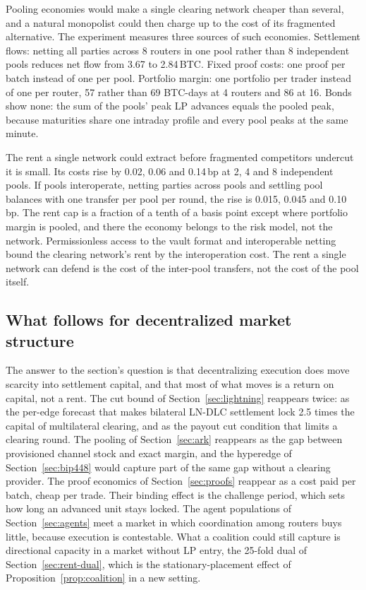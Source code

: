 Pooling economies would make a single clearing network cheaper than several, and a natural monopolist could then charge up to the cost of its fragmented alternative. The experiment measures three sources of such economies. Settlement flows: netting all parties across 8 routers in one pool rather than 8 independent pools reduces net flow from 3.67 to 2.84\,BTC. Fixed proof costs: one proof per batch instead of one per pool. Portfolio margin: one portfolio per trader instead of one per router, 57 rather than 69 BTC-days at 4 routers and 86 at 16. Bonds show none: the sum of the pools' peak LP advances equals the pooled peak, because maturities share one intraday profile and every pool peaks at the same minute.

The rent a single network could extract before fragmented competitors undercut it is small. Its costs rise by 0.02, 0.06 and 0.14\,bp at 2, 4 and 8 independent pools. If pools interoperate, netting parties across pools and settling pool balances with one transfer per pool per round, the rise is 0.015, 0.045 and 0.10\,bp. The rent cap is a fraction of a tenth of a basis point except where portfolio margin is pooled, and there the economy belongs to the risk model, not the network. Permissionless access to the vault format and interoperable netting bound the clearing network's rent by the interoperation cost. The rent a single network can defend is the cost of the inter-pool transfers, not the cost of the pool itself.

\subsection{What follows for decentralized market structure}
\label{sec:rent-implications}

The answer to the section's question is that decentralizing execution does move scarcity into settlement capital, and that most of what moves is a return on capital, not a rent. The cut bound of Section~\ref{sec:lightning} reappears twice: as the per-edge forecast that makes bilateral LN-DLC settlement lock 2.5 times the capital of multilateral clearing, and as the payout cut condition that limits a clearing round. The pooling of Section~\ref{sec:ark} reappears as the gap between provisioned channel stock and exact margin, and the hyperedge of Section~\ref{sec:bip448} would capture part of the same gap without a clearing provider. The proof economics of Section~\ref{sec:proofs} reappear as a cost paid per batch, cheap per trade. Their binding effect is the challenge period, which sets how long an advanced unit stays locked. The agent populations of Section~\ref{sec:agents} meet a market in which coordination among routers buys little, because execution is contestable. What a coalition could still capture is directional capacity in a market without LP entry, the 25-fold dual of Section~\ref{sec:rent-dual}, which is the stationary-placement effect of Proposition~\ref{prop:coalition} in a new setting.

